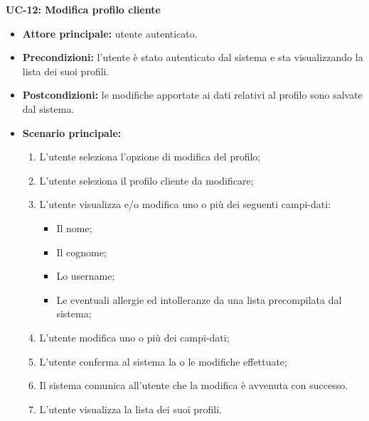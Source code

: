 \textbf{UC-12: Modifica profilo cliente}
\begin{itemize}
\item \textbf{Attore principale:} utente autenticato.
\item \textbf{Precondizioni:} l'utente è stato autenticato dal sistema e sta visualizzando la lista dei suoi profili.
\item \textbf{Postcondizioni:} le modifiche apportate ai dati relativi al profilo sono salvate dal sistema.
\item \textbf{Scenario principale:}
\begin{enumerate}
    \item L'utente seleziona l'opzione di modifica del profilo;
    \item L'utente seleziona il profilo cliente da modificare;
    \item L'utente visualizza e/o modifica uno o più dei seguenti campi-dati:
        \begin{itemize}
            \item Il nome;
            \item Il cognome;
            \item Lo username;
            \item Le eventuali allergie ed intolleranze da una lista precompilata dal sistema;
        \end{itemize}
    \item L'utente modifica uno o più dei campi-dati;
    \item L'utente conferma al sistema la o le modifiche effettuate;
    \item Il sistema comunica all'utente che la modifica è avvenuta con successo.
    \item L'utente visualizza la lista dei suoi profili.
\end{enumerate}
\end{itemize}


